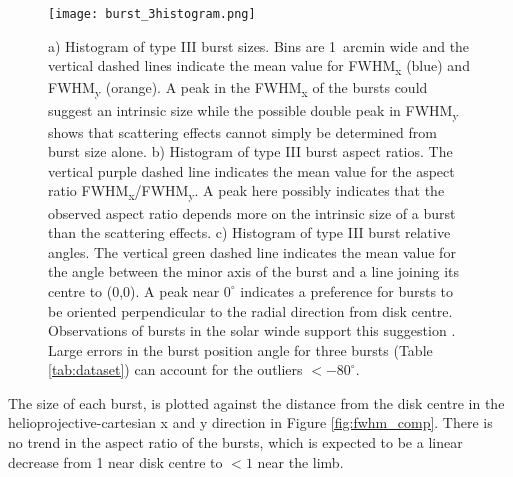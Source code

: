 \begin{figure}
\centering
\texttt{[image: burst\_3histogram.png]}
\caption[Histograms of type III burst sizes, aspect ratios and relative angles.]{a) Histogram of type III burst sizes. Bins are 1~arcmin wide and the vertical dashed lines indicate the mean value for FWHM\textsubscript{x} (blue) and FWHM\textsubscript{y} (orange). A peak in the FWHM\textsubscript{x} of the bursts could suggest an intrinsic size while the possible double peak in FWHM\textsubscript{y} shows that scattering effects cannot simply be determined from burst size alone. b) Histogram of type III burst aspect ratios. The vertical purple dashed line indicates the mean value for the aspect ratio FWHM\textsubscript{x}/FWHM\textsubscript{y}. A peak here possibly indicates that the observed aspect ratio depends more on the intrinsic size of a burst than the scattering effects. c) Histogram of type III burst relative angles. The vertical green dashed line indicates the mean value for the angle between the minor axis of the burst and a line joining its centre to (0,0). A peak near $0^\circ$ indicates a preference for bursts to be oriented perpendicular to the radial direction from disk centre. Observations of bursts in the solar winde support this suggestion \citep{Anantharamaiah1994,SasikumarRaja2016}. Large errors in the burst position angle for three bursts (Table \ref{tab:dataset}) can account for the outliers $< -80^\circ$.}
\label{fig:burst_hist}
\end{figure}
The size of each burst, is plotted against the distance from the disk centre in the helioprojective-cartesian x and y direction in Figure \ref{fig:fwhm_comp}. 
There is no trend in the aspect ratio of the bursts, which is expected to be a linear decrease from 1 near disk centre to $< 1$ near the limb. 

